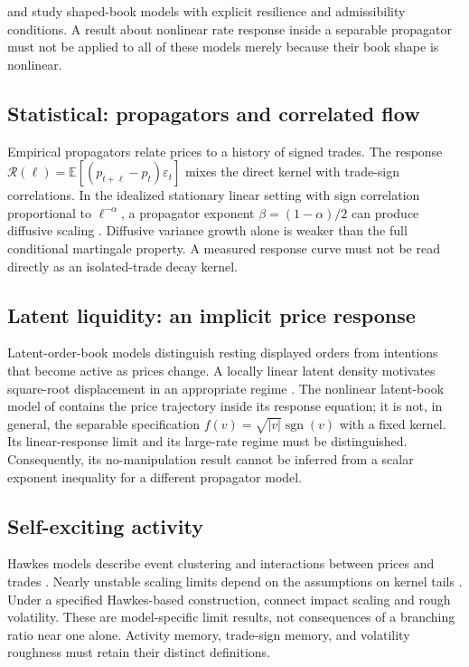 \documentclass[11pt]{article}
\numberwithin{equation}{section}
\theoremstyle{definition}
\theoremstyle{remark}
\newcommand{\E}{\mathbb{E}}
\theoremstyle{definition}
\begin{document}
\citet{alfonsifruthschied2010} and \citet{predoiu2011} study shaped-book models
with explicit resilience and admissibility conditions. A result about nonlinear
rate response inside a separable propagator must not be applied to all of these
models merely because their book shape is nonlinear.

\subsection{Statistical: propagators and correlated flow}

Empirical propagators relate prices to a history of signed trades. The response
$\mathcal R(\ell)=\E[(p_{t+\ell}-p_t)\varepsilon_t]$ mixes the direct kernel with
trade-sign correlations. In the idealized stationary linear setting with sign
correlation proportional to $\ell^{-\alpha}$, a propagator exponent
$\beta=(1-\alpha)/2$ can produce diffusive scaling
\citep{bouchaud2004,lilloFarmer2004}. Diffusive variance growth alone is weaker
than the full conditional martingale property. A measured response curve must not
be read directly as an isolated-trade decay kernel.

\subsection{Latent liquidity: an implicit price response}

Latent-order-book models distinguish resting displayed orders from intentions
that become active as prices change. A locally linear latent density motivates
square-root displacement in an appropriate regime \citep{toth2011}.
The nonlinear latent-book model of \citet{donier2015} contains the price trajectory
inside its response equation; it is not, in general, the separable specification
$f(v)=\sqrt{|v|}\operatorname{sgn}(v)$ with a fixed kernel. Its linear-response
limit and its large-rate regime must be distinguished. Consequently, its
no-manipulation result cannot be inferred from a scalar exponent inequality for
a different propagator model.

\subsection{Self-exciting activity}

Hawkes models describe event clustering and interactions between prices and trades
\citep{bacrymuzy2014}. Nearly unstable scaling limits depend on the assumptions on
kernel tails \citep{jaissonrosenbaum2015}. Under a specified Hawkes-based
construction, \citet{jusselin2020} connect impact scaling and rough volatility.
These are model-specific limit results, not consequences of a branching ratio
near one alone. Activity memory, trade-sign memory, and volatility roughness
must retain their distinct definitions.
\end{document}
